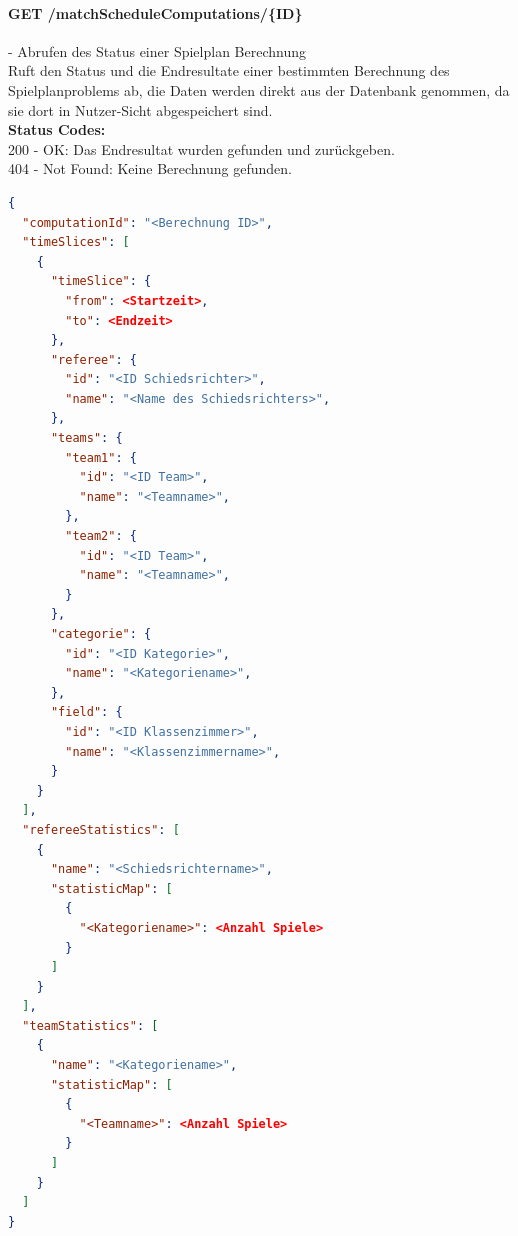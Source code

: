\paragraph{GET /matchScheduleComputations/\{ID\}} - Abrufen des Status einer Spielplan Berechnung\mbox{}\\
Ruft den Status und die Endresultate einer bestimmten Berechnung des Spielplanproblems ab, die Daten werden direkt aus der Datenbank genommen, da sie dort in Nutzer-Sicht abgespeichert sind.\\
\textbf{Status Codes:}\\
200 - OK: Das Endresultat wurden gefunden und zurückgeben.\\
404 - Not Found: Keine Berechnung gefunden.\\

\begin{lstlisting}[language=JSON, caption=Beispiel eines Endresultates für das Spielplanproblem, label=lst:solution_matchScheduling]  
{
  "computationId": "<Berechnung ID>",
  "timeSlices": [
    {
      "timeSlice": {
        "from": <Startzeit>,
        "to": <Endzeit>
      },
      "referee": {
        "id": "<ID Schiedsrichter>",
        "name": "<Name des Schiedsrichters>",
      },
      "teams": {
        "team1": {
          "id": "<ID Team>",
          "name": "<Teamname>",
        },
        "team2": {
          "id": "<ID Team>",
          "name": "<Teamname>",
        }
      },
      "categorie": {
        "id": "<ID Kategorie>",
        "name": "<Kategoriename>",
      },
      "field": {
        "id": "<ID Klassenzimmer>",
        "name": "<Klassenzimmername>",
      }
    }
  ],
  "refereeStatistics": [
    {
      "name": "<Schiedsrichtername>",
      "statisticMap": [
        {
          "<Kategoriename>": <Anzahl Spiele>
        }
      ]
    }
  ],
  "teamStatistics": [
    {
      "name": "<Kategoriename>",
      "statisticMap": [
        {
          "<Teamname>": <Anzahl Spiele>
        }
      ]
    }
  ]
}
\end{lstlisting}
